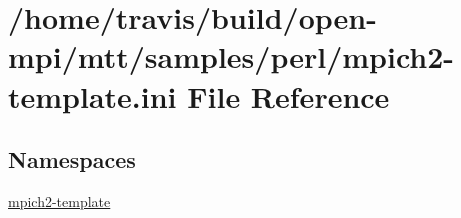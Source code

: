 \hypertarget{mpich2-template_8ini}{\section{/home/travis/build/open-\/mpi/mtt/samples/perl/mpich2-\/template.ini File Reference}
\label{mpich2-template_8ini}
}
\subsection*{Namespaces}
\begin{DoxyCompactItemize}
\item 
\hyperlink{namespacempich2-template}{mpich2-\/template}
\end{DoxyCompactItemize}
